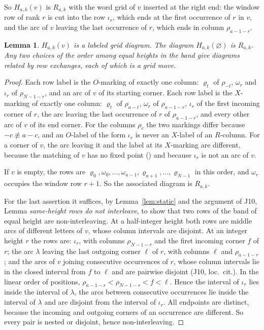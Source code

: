 \documentclass[11pt]{amsart}
\newtheorem{lemma}[theorem]{Lemma}
\theoremstyle{definition}
\theoremstyle{remark}
\newcommand{\lean}[1]{\texttt{\seqsplit{#1}}}
\begin{document}
So $H_{a,k}(v)$ is $R_{a,k}$ with the word grid of $v$ inserted at the right end: the window row of
rank $r$ is cut into the row $\iota_r$, which ends at the first occurrence of $r$ in $v$, and the
arc of $v$ leaving the last occurrence of $r$, which ends in column $\rho_{a-1-r}$.

\begin{lemma}\label{lem:hybrid-grid}
$H_{a,k}(v)$ is a labeled grid diagram. The diagram $H_{a,k}(\varnothing)$ is $R_{a,k}$. Any two
choices of the order among equal heights in the band give diagrams related by row exchanges, each of
which is a grid move.
\end{lemma}

\begin{proof}
Each row label is the $O$-marking of exactly one column: $\varrho_t$ of $\rho_{-t}$, $\omega_r$ and
$\iota_r$ of $\rho_{N-1-r}$, and an arc of $v$ of its starting corner. Each row label is the
$X$-marking of exactly one column: $\varrho_t$ of $\rho_{a-t}$, $\omega_r$ of $\rho_{a-1-r}$,
$\iota_r$ of the first incoming corner of $r$, the arc leaving the last occurrence of $r$ of
$\rho_{a-1-r}$, and every other arc of $v$ of its end corner. For the columns $\rho_c$ the two
markings differ because $-c\not\equiv a-c$, and an $O$-label of the form $\iota_r$ is never an
$X$-label of an $R$-column. For a corner of $v$, the arc leaving it and the label at its $X$-marking
are different, because the matching of $v$ has no fixed point
(\lean{positiveRectilinearWordMatching\_ne\_self}) and because $\iota_r$ is not an arc of $v$.

If $v$ is empty, the rows are $\varrho_0,\omega_0,\dots,\omega_{a-1},\varrho_{a+1},\dots,\varrho_{N-1}$
in this order, and $\omega_r$ occupies the window row $r+1$. So the associated diagram is
$R_{a,k}$.

For the last assertion it suffices, by Lemma~\ref{lem:static} and the argument of J10, Lemma
\emph{same-height rows do not interleave}, to show that two rows of the band of equal height are
non-interleaving. At a half-integer height both rows are middle arcs of different letters of $v$,
whose column intervals are disjoint. At an integer height $r$ the rows are: $\iota_r$, with
columns $\rho_{N-1-r}$ and the first incoming corner $f$ of $r$; the arc $\lambda$ leaving the last
outgoing corner $\ell$ of $r$, with columns $\ell$ and $\rho_{a-1-r}$; and the arcs of $v$ joining
consecutive occurrences of $r$, whose column intervals lie in the closed interval from $f$ to
$\ell$ and are pairwise disjoint (J10, loc.\ cit.). In the linear order of positions,
$\rho_{a-1-r}<\rho_{N-1-r}<f<\ell$. Hence the interval of $\iota_r$ lies inside the interval of
$\lambda$, the arcs between consecutive occurrences lie inside the interval of $\lambda$ and are
disjoint from the interval of $\iota_r$. All endpoints are distinct, because the incoming and
outgoing corners of an occurrence are different. So every pair is nested or disjoint, hence
non-interleaving.
\end{proof}
\end{document}
